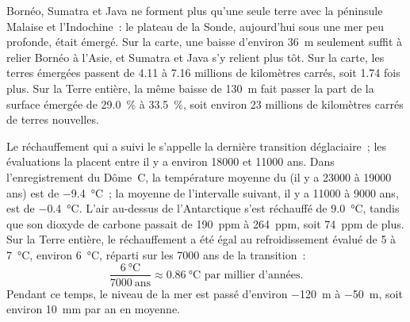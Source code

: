 Bornéo, Sumatra et Java ne forment plus qu'une seule terre avec la
péninsule Malaise et l'Indochine~: le plateau de la Sonde, aujourd'hui sous
une mer peu profonde, était émergé. Sur la carte, une baisse d'environ
\qty{36}{m} seulement suffit à relier Bornéo à l'Asie, et Sumatra et Java
s'y relient plus tôt. Sur la carte, les terres émergées passent de 4.11 à
7.16 millions de kilomètres carrés, soit 1.74 fois plus. Sur la Terre
entière, la même baisse de \qty{130}{m} fait passer la part de la surface
émergée de \qty{29.0}{\percent} à \qty{33.5}{\percent}, soit environ 23
millions de kilomètres carrés de terres nouvelles.

\begin{example}
Le réchauffement qui a suivi le  s'appelle la
dernière transition déglaciaire~; les évaluations la placent entre il y a
environ \num{18000} et \num{11000} ans. Dans l'enregistrement du Dôme~C,
la température moyenne du  (il y a \num{23000} à
\num{19000} ans) est de \qty{-9.4}{\degreeCelsius}~; la moyenne de
l'intervalle suivant, il y a \num{11000} à \num{9000} ans, est de
\qty{-0.4}{\degreeCelsius}. L'air au-dessus de l'Antarctique s'est
réchauffé de \qty{9.0}{\degreeCelsius}, tandis que son dioxyde de carbone
passait de \qty{190}{ppm} à \qty{264}{ppm}, soit \qty{74}{ppm} de plus. Sur
la Terre entière, le réchauffement a été égal au refroidissement évalué de
5 à \qty{7}{\degreeCelsius}, environ \qty{6}{\degreeCelsius}, réparti sur
les \num{7000} ans de la transition~:
\[
  \frac{\qty{6}{\degreeCelsius}}{\num{7000}\ \text{ans}} \approx
  \qty{0.86}{\degreeCelsius} \text{ par millier d'années.}
\]
Pendant ce temps, le niveau de la mer est passé d'environ \qty{-120}{m} à
\qty{-50}{m}, soit environ \qty{10}{mm} par an en moyenne.
\end{example}


